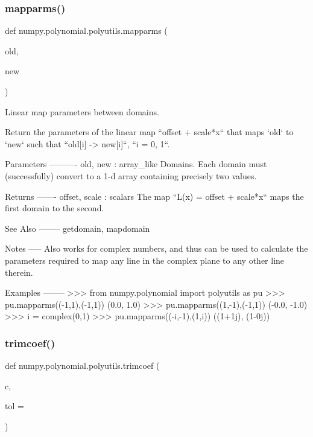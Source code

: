 \subsubsection{\texorpdfstring{mapparms()}{mapparms()}}
{\footnotesize\ttfamily def numpy.\+polynomial.\+polyutils.\+mapparms (\begin{DoxyParamCaption}\item[{}]{old,  }\item[{}]{new }\end{DoxyParamCaption})}

\begin{DoxyVerb}Linear map parameters between domains.

Return the parameters of the linear map ``offset + scale*x`` that maps
`old` to `new` such that ``old[i] -> new[i]``, ``i = 0, 1``.

Parameters
----------
old, new : array_like
    Domains. Each domain must (successfully) convert to a 1-d array
    containing precisely two values.

Returns
-------
offset, scale : scalars
    The map ``L(x) = offset + scale*x`` maps the first domain to the
    second.

See Also
--------
getdomain, mapdomain

Notes
-----
Also works for complex numbers, and thus can be used to calculate the
parameters required to map any line in the complex plane to any other
line therein.

Examples
--------
>>> from numpy.polynomial import polyutils as pu
>>> pu.mapparms((-1,1),(-1,1))
(0.0, 1.0)
>>> pu.mapparms((1,-1),(-1,1))
(-0.0, -1.0)
>>> i = complex(0,1)
>>> pu.mapparms((-i,-1),(1,i))
((1+1j), (1-0j))\end{DoxyVerb}
 \mbox{\label{namespacenumpy_1_1polynomial_1_1polyutils_a3c9e5301a8a54cc010e7c3bfee6fc674}} 
\subsubsection{\texorpdfstring{trimcoef()}{trimcoef()}}
{\footnotesize\ttfamily def numpy.\+polynomial.\+polyutils.\+trimcoef (\begin{DoxyParamCaption}\item[{}]{c,  }\item[{}]{tol = {} }\end{DoxyParamCaption})}

